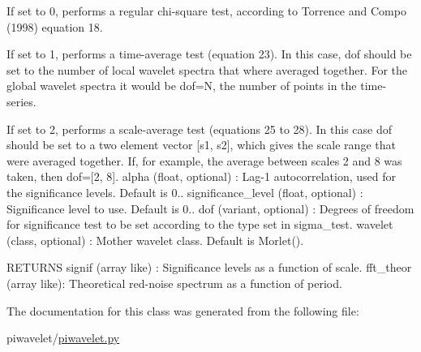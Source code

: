 If set to 0, performs a regular chi-\/square test, according to Torrence and Compo (1998) equation 18.

If set to 1, performs a time-\/average test (equation 23). In this case, dof should be set to the number of local wavelet spectra that where averaged together. For the global wavelet spectra it would be dof=N, the number of points in the time-\/series.

If set to 2, performs a scale-\/average test (equations 25 to 28). In this case dof should be set to a two element vector \mbox{[}s1, s2\mbox{]}, which gives the scale range that were averaged together. If, for example, the average between scales 2 and 8 was taken, then dof=\mbox{[}2, 8\mbox{]}. alpha (float, optional) \-: Lag-\/1 autocorrelation, used for the significance levels. Default is 0.. significance\-\_\-level (float, optional) \-: Significance level to use. Default is 0.. dof (variant, optional) \-: Degrees of freedom for significance test to be set according to the type set in sigma\-\_\-test. wavelet (class, optional) \-: Mother wavelet class. Default is Morlet().

R\-E\-T\-U\-R\-N\-S signif (array like) \-: Significance levels as a function of scale. fft\-\_\-theor (array like)\-: Theoretical red-\/noise spectrum as a function of period. 

The documentation for this class was generated from the following file\-:\begin{DoxyCompactItemize}
\item 
piwavelet/\hyperlink{piwavelet_8py}{piwavelet.\-py}\end{DoxyCompactItemize}
